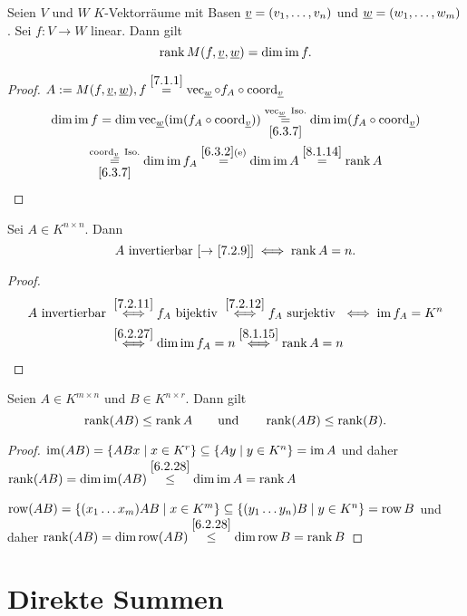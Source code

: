 \documentclass[../../main.tex]{subfiles}
\begin{document}
\begin{pro}\label{8.1.15}
Seien $V$ und $W$ $K$-Vektorräume mit Basen ${\underline v} = (v_1,\ldots,v_n)$ und ${\underline w} = (w_1,\ldots,w_m)$. Sei $f\colon V\to W$ linear. Dann gilt
\[\operatorname{rank} M(f,{\underline v},{\underline w}) = \dim \operatorname{im} f.\]
\end{pro}
\begin{proof}
$A:=M(f,{\underline v},{\underline w}), f\overset{\ref{7.1.1}}{=}\operatorname{vec}_{\underline w} \circ f_A \circ \operatorname{coord}_{\underline v}$
\begin{multline*}
\dim \operatorname{im} f = \dim \operatorname{vec}_{\underline w}(\operatorname{im} (f_A\circ \operatorname{coord}_{\underline v})) \overset{\operatorname{vec}_{\underline w} \text{ Iso.}}{\underset{\ref{6.3.7}}{=}}\dim \operatorname{im} (f_A\circ \operatorname{coord}_{\underline v})\\ \overset{\operatorname{coord}_{\underline v} \text{ Iso.}}{\underset{\ref{6.3.7}}{=}}\dim \operatorname{im} f_A
\overset{\ref{6.3.2}\text{(e)}}{=} \dim \operatorname{im} A \overset{\ref{8.1.14}}{=} \operatorname{rank} A
\end{multline*}
\end{proof}

\begin{pro}\label{8.1.16}
Sei $A\in K^{n\times n}$. Dann
\[\text{$A$ invertierbar {\rm[$\to$ \ref{7.2.9}]}}\iff\operatorname{rank} A = n.\]
\end{pro}
\begin{proof}
\begin{align*}
A \text{ invertierbar } & \overset{\ref{7.2.11}}{\iff} f_A \text{ bijektiv }\overset{\ref{7.2.12}}{\iff} f_A \text{ surjektiv }\iff \operatorname{im} f_A = K^n\\
& \overset{\ref{6.2.27}}{\iff} \dim \operatorname{im} f_A = n \overset{\ref{8.1.15}}{\iff}\operatorname{rank} A = n
\end{align*}
\end{proof}

\begin{pro}\label{8.1.17}
Seien $A\in K^{m\times n}$ und $B\in K^{n\times r}$. Dann gilt
$$\operatorname{rank}(AB)\le \operatorname{rank} A \qquad\text{und}\qquad \operatorname{rank}(AB) \le \operatorname{rank}(B).$$
\end{pro}
\begin{proof}
$\operatorname{im} (AB) = \left\{ABx \mid x\in K^r\right\} \subseteq \left\{Ay\mid y\in K^n\right\} = \operatorname{im} A$
und daher $\operatorname{rank} (AB) = \dim \operatorname{im} (AB) \overset{\ref{6.2.28}}{\le} \dim \operatorname{im} A = \operatorname{rank} A$

$\operatorname{row} (AB) = \left\{(x_1\ldots x_m)AB\mid x\in K^m\right\} \subseteq \left\{(y_1\ldots y_n)B\mid y\in K^n\right\} = \operatorname{row} B$
und daher $\operatorname{rank} (AB) = \dim \operatorname{row}(AB) \overset{\ref{6.2.28}}{\le} \dim \operatorname{row} B = \operatorname{rank} B$
\end{proof}

\section{Direkte Summen}
\end{document}
